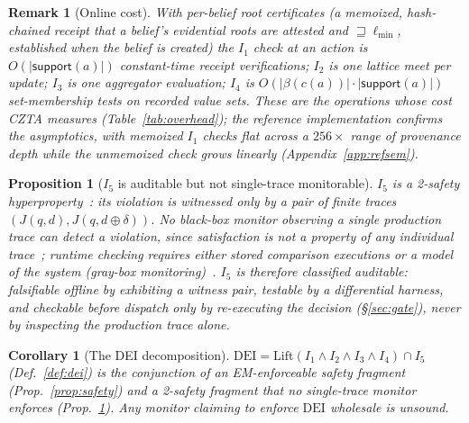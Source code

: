 \documentclass[conference,compsoc]{IEEEtran}
\newtheorem{proposition}{Proposition}
\newtheorem{corollary}{Corollary}
\newtheorem{remark}{Remark}
\theoremstyle{definition}
\theoremstyle{plain}
\newcommand{\Ione}{\ensuremath{I_1}}
\newcommand{\Itwo}{\ensuremath{I_2}}
\newcommand{\Ithree}{\ensuremath{I_3}}
\newcommand{\Ifour}{\ensuremath{I_4}}
\newcommand{\Ifive}{\ensuremath{I_5}}
\providecommand{\Lift}{\mathrm{Lift}}
\newcommand{\support}{\ensuremath{\mathsf{support}}}
\newcommand{\bindpol}{\ensuremath{\beta}}
\newcommand{\lmin}{\ensuremath{\ell_{\min}}}
\newcommand{\DEI}{\ensuremath{\mathrm{DEI}}}
\begin{document}
\begin{remark}[Online cost]
With per-belief \emph{root certificates} (a memoized, hash-chained
receipt that a belief's evidential roots are attested and
$\sqsupseteq \lmin$, established when the belief is created) the
\Ione{} check at an action is $O(|\support(a)|)$ constant-time receipt
verifications; \Itwo{} is one lattice meet per update; \Ithree{} is one
aggregator evaluation; \Ifour{} is $O(|\bindpol(c(a))| \cdot
|\support(a)|)$ set-membership tests on recorded value sets. These are
the operations whose cost CZTA measures (Table~\ref{tab:overhead}); the
reference implementation confirms the asymptotics, with memoized
\Ione{} checks flat across a $256\times$ range of provenance depth
while the unmemoized check grows linearly
(Appendix~\ref{app:refsem}).
\end{remark}

\begin{proposition}[\Ifive{} is auditable but not single-trace monitorable]
\label{prop:hyper}
\Ifive{} is a 2-safety hyperproperty~\cite{hyperprops}: its
violation is witnessed only by a pair of finite traces
$(J(q, d), J(q, d \oplus \delta))$. No black-box monitor observing
a single production trace can detect a violation, since
satisfaction is not a property of any individual
trace~\cite{hyperprops}; runtime checking requires either stored
comparison executions or a model of the system (gray-box
monitoring)~\cite{finkbeiner,stucki}. \Ifive{} is therefore
classified \emph{auditable}: falsifiable offline by exhibiting a
witness pair, testable by a differential harness, and checkable before
dispatch only by re-executing the decision (\S\ref{sec:gate}), never by
inspecting the production trace alone.
\end{proposition}

\begin{corollary}[The DEI decomposition]
\label{cor:decomp}
$\DEI = \Lift(\Ione \wedge \Itwo \wedge \Ithree \wedge \Ifour) \cap \Ifive$
(Def.~\ref{def:dei}) is the conjunction of an EM-enforceable
safety fragment (Prop.~\ref{prop:safety}) and a 2-safety fragment
that no single-trace monitor enforces (Prop.~\ref{prop:hyper}).
Any monitor claiming to enforce \DEI{} wholesale is unsound.
\end{corollary}
\end{document}
